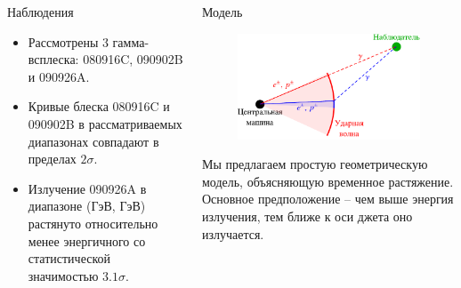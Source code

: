 \documentclass[russian]{beamer}
\begin{document}
\begin{frame}
\begin{columns}[t]
\begin{column}[t]{0.4\linewidth}
\begin{block}{Наблюдения}
\begin{figure}
					\end{figure}

					\begin{itemize}
						\item{Рассмотрены 3 гамма-всплеска: 080916C, 090902B и 090926A.}
						\item{Кривые блеска 080916C и 090902B в рассматриваемых диапазонах совпадают в пределах $2\sigma$.}
						\item{Излучение 090926A в диапазоне (\unit[1]{ГэВ}, \unit[300]{ГэВ}) растянуто относительно менее энергичного со статистической значимостью $3.1\sigma$.}
					\end{itemize}

			   	\end{block}

			\end{column}

			\begin{column}[t]{0.4\linewidth}

			   	\begin{block}{Модель}

			   		\begin{figure}
						\centering
						\includegraphics[width=\textwidth]{modelExplanation.pdf}
						\label{fig:modelExplanation}
			   		\end{figure}

					Мы предлагаем простую геометрическую модель, объясняющую временное растяжение. Основное предположение -- чем выше энергия излучения, тем ближе к оси джета оно излучается.


\end{block}
\end{column}
\end{columns}
\end{frame}
\end{document}
